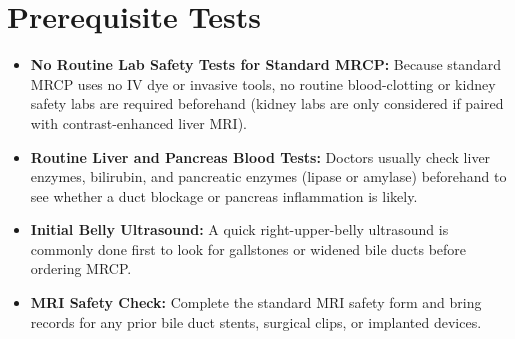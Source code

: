 \section{Prerequisite Tests}
\begin{itemize}
\item \textbf{No Routine Lab Safety Tests for Standard MRCP:} Because standard MRCP uses no IV dye or invasive tools, no routine blood-clotting or kidney safety labs are required beforehand (kidney labs are only considered if paired with contrast-enhanced liver MRI).
\item \textbf{Routine Liver and Pancreas Blood Tests:} Doctors usually check liver enzymes, bilirubin, and pancreatic enzymes (lipase or amylase) beforehand to see whether a duct blockage or pancreas inflammation is likely.
\item \textbf{Initial Belly Ultrasound:} A quick right-upper-belly ultrasound is commonly done first to look for gallstones or widened bile ducts before ordering MRCP.
\item \textbf{MRI Safety Check:} Complete the standard MRI safety form and bring records for any prior bile duct stents, surgical clips, or implanted devices.
\end{itemize}

